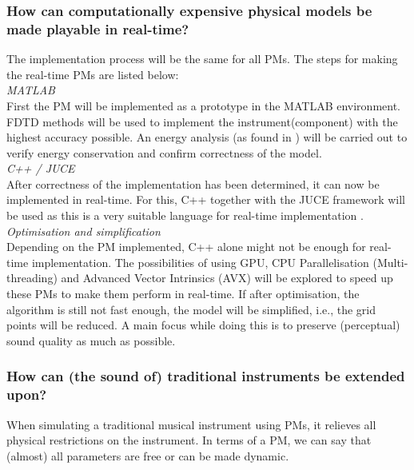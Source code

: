 \subsubsection*{How can computationally expensive physical models be made playable in real-time?}
The implementation process will be the same for all PMs. The steps for making the real-time PMs are listed below:
\\

\noindent\textit{MATLAB}
\vspace{0.15cm}
\\
\noindent First the PM will be implemented as a prototype in the MATLAB environment. FDTD methods will be used to implement the instrument(component) with the highest accuracy possible. An energy analysis (as found in \cite{Bilbao2009}) will be carried out to verify energy conservation and confirm correctness of the model.
\\

\noindent\textit{C++ / JUCE}
\vspace{0.15cm}
\\
\noindent 
After correctness of the implementation has been determined, it can now be implemented in real-time. For this, C++  together with the JUCE framework will be used as this is a very suitable language for real-time implementation \cite{Meyers2005, JUCE}.
\\

\noindent\textit{Optimisation and simplification}
\vspace{0.15cm}
\\
\noindent 
Depending on the PM implemented, C++ alone might not be enough for real-time implementation. The possibilities of using GPU, CPU Parallelisation (Multi-threading) and Advanced Vector Intrinsics (AVX) will be explored to speed up these PMs to make them perform in real-time. If after optimisation, the algorithm is still not fast enough, the model will be simplified, i.e., the grid points will be reduced. A main focus while doing this is to preserve (perceptual) sound quality as much as possible.

\subsubsection*{How can (the sound of) traditional instruments be extended upon?}

When simulating a traditional musical instrument using PMs, it relieves all physical restrictions on the instrument. In terms of a PM, we can say that (almost) all parameters are free or can be made dynamic.

